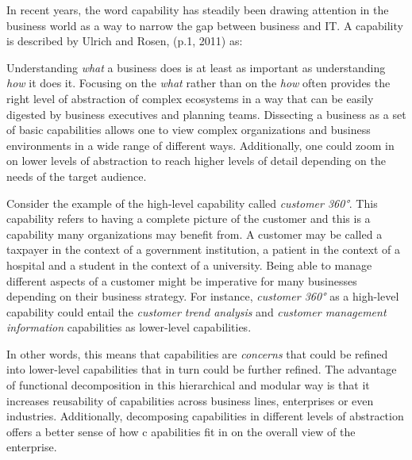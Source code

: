 %
%
In recent years, the word capability has steadily been drawing attention in the business world
as a way to narrow the gap between business and IT.
A capability is described by Ulrich and Rosen, (p.1, 2011) as:


Understanding \textit{what} a business does is at least as important as understanding \textit{how} it does it.
Focusing on the \textit{what} rather than on the \textit{how} often provides the right level of abstraction
of complex ecosystems in a way that can be easily digested by business executives and planning teams.
Dissecting a business as a set of basic capabilities allows one to view complex organizations and
business environments in a wide range of different ways.
Additionally, one could zoom in on lower levels of abstraction to reach higher levels of detail
depending on the needs of the target audience.

Consider the example of the high-level capability called \textit{customer 360°}.
This capability refers to having a complete picture of the customer and this is a capability many organizations may
benefit from.
A customer may be called a taxpayer in the context of a government institution, a patient in the context of a hospital
and a student in the context of a university.
Being able to manage different aspects of a customer might be imperative for many businesses depending on
their business strategy.
For instance, \textit{customer 360°} as a high-level capability could entail the \textit{customer trend analysis} and
\textit{customer management information} capabilities as lower-level capabilities.

In other words, this means that capabilities are \textit{concerns} that could be refined into lower-level capabilities
that in turn could be further refined.
The advantage of functional decomposition in this hierarchical and modular way is that it increases reusability
of capabilities across business lines, enterprises or even industries.
Additionally, decomposing capabilities in different levels of abstraction offers a better sense of how c
apabilities fit in on the overall view of the enterprise.

